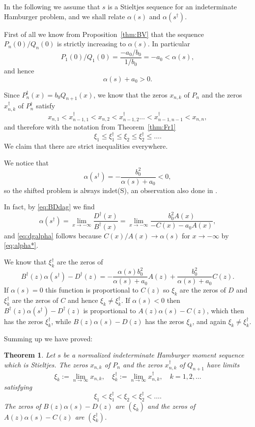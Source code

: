 \documentclass[12pt]{article}
\newtheorem{thm}{Theorem}[section]
\begin{document}
 In the following we assume that $s$ is a Stieltjes sequence for an indeterminate Hamburger problem, and we shall relate $\alpha(s)$ and $\alpha(s^\dagger)$. 
 
First of all we know from Proposition~\ref{thm:BV} that the sequence $P_n(0)/Q_n(0)$ is strictly increasing to $\alpha(s)$. In particular
$$
P_1(0)/Q_1(0)=\frac{-a_0/b_0}{1/b_0}=-a_0<\alpha(s),
$$
and hence
\begin{equation}\label{eq:a_0}
\alpha(s)+a_0>0.
\end{equation}

Since $P^\dagger_n(x)=b_0Q_{n+1}(x)$, we know that the zeros $x_{n,k}$ of $P_n$ and 
the zeros $x^\dagger_{n,k}$ of $P^\dagger_n$ satisfy
$$
x_{n,1}<x^\dagger_{n-1,1}<x_{n,2}<x^\dagger_{n-1,2}\ldots<x^\dagger_{n-1,n-1}<x_{n,n},
$$
and therefore with the notation from Theorem~\ref{thm:Fr1}
$$
\xi_1\le \xi^\dagger_1\le \xi_2\le \xi^\dagger_2\le\ldots.
$$
We claim that there are strict inequalities everywhere.

We notice that
\begin{equation}\label{eq:dgalpha}
\alpha(s^\dagger)=-\frac{b_0^2}{\alpha(s)+a_0}<0,
\end{equation}
so the shifted problem is always indet(S), an observation also done in \cite[Remark 4.5]{B0}.

In fact, by \eqref{eq:BDdag} we find
$$
\alpha(s^\dagger)=\lim_{x\to-\infty}\frac{D^\dagger(x)}{B^\dagger(x)}=\lim_{x\to-\infty}\frac{b_0^2A(x)}{-C(x)-a_0A(x)},
$$
and \eqref{eq:dgalpha} follows because $C(x)/A(x)\to \alpha(s)$ for $x\to-\infty$ by
\eqref{eq:alpha*}.

We know that $\xi^\dagger_k$ are the zeros of
$$ 
B^\dagger(z)\alpha(s^\dagger)-D^\dagger(z)=-\frac{\alpha(s) b_0^2}{\alpha(s)+a_0}A(z)+\frac{b_0^2}{\alpha(s)+a_0} C(z).
$$
If $\alpha(s)=0$ this function is proportional to $C(z)$ so $\xi_k$ are the zeros of $D$ and $\xi^\dagger_k$ are the zeros of $C$ and hence $\xi_k\neq \xi^\dagger_k$. If $\alpha(s)<0$
then  $B^\dagger(z)\alpha(s^\dagger)-D^\dagger(z)$ is proportional to $A(z)\alpha(s)-C(z)$, which then has the zeros $\xi^\dagger_k$, while $B(z)\alpha(s)-D(z)$ has the zeros $\xi_k$, and again $\xi_k\neq \xi^\dagger_k$.

Summing up we have proved:

\begin{thm}\label{thm:final} Let $s$ be a normalized indeterminate Hamburger moment sequence which is Stieltjes. The zeros $x_{n,k}$ of $P_n$ and the zeros $x^\dagger_{n,k}$ of $Q_{n+1}$ have limits
$$
\xi_k:=\lim_{n\to\infty}x_{n,k},\quad \xi^\dagger_k:=\lim_{n\to\infty} x^\dagger_{n,k},\quad k=1,2,\ldots
$$  
satisfying
$$
\xi_1 < \xi^\dagger_1 < \xi_2 < \xi^\dagger_2 <\ldots.
$$
The zeros of $B(z)\alpha(s)-D(z)$ are $(\xi_k)$ and the zeros of $A(z)\alpha(s)-C(z)$ are
$(\xi^\dagger_k)$.  
\end{thm}
\end{document}
